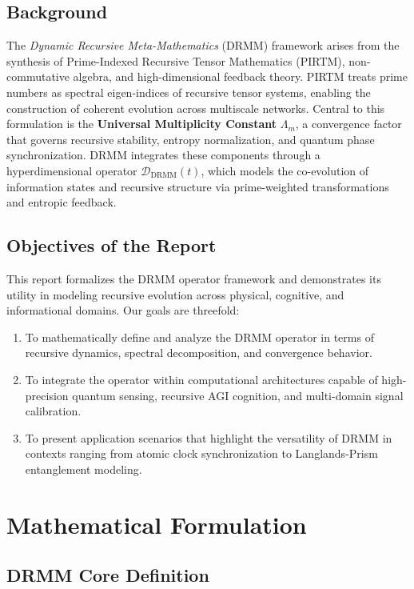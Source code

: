 \documentclass{article}
\theoremstyle{plain}
\begin{document}
\subsection{Background}

The \textit{Dynamic Recursive Meta-Mathematics} (DRMM) framework arises from the synthesis of Prime-Indexed Recursive Tensor Mathematics (PIRTM), non-commutative algebra, and high-dimensional feedback theory. PIRTM treats prime numbers as spectral eigen-indices of recursive tensor systems, enabling the construction of coherent evolution across multiscale networks. Central to this formulation is the \textbf{Universal Multiplicity Constant} $\Lambda_m$, a convergence factor that governs recursive stability, entropy normalization, and quantum phase synchronization. DRMM integrates these components through a hyperdimensional operator $\mathcal{D}_{\text{DRMM}}(t)$, which models the co-evolution of information states and recursive structure via prime-weighted transformations and entropic feedback.

\subsection{Objectives of the Report}

This report formalizes the DRMM operator framework and demonstrates its utility in modeling recursive evolution across physical, cognitive, and informational domains. Our goals are threefold:

\begin{enumerate}
    \item To mathematically define and analyze the DRMM operator in terms of recursive dynamics, spectral decomposition, and convergence behavior.
    \item To integrate the operator within computational architectures capable of high-precision quantum sensing, recursive AGI cognition, and multi-domain signal calibration.
    \item To present application scenarios that highlight the versatility of DRMM in contexts ranging from atomic clock synchronization to Langlands-Prism entanglement modeling.
\end{enumerate}

\section{Mathematical Formulation}

\subsection{DRMM Core Definition}
\end{document}
